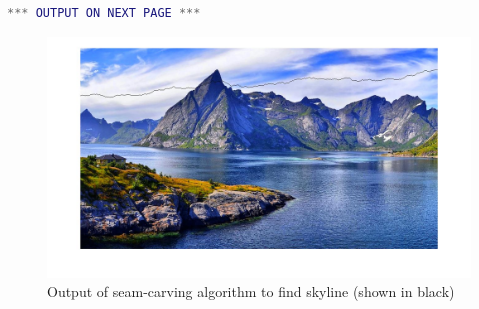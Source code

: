 \documentclass{csc_assignment4}
\begin{document}
\begin{description}
\begin{lstlisting}[language=MATLAB]
*** OUTPUT ON NEXT PAGE ***
\end{lstlisting}
\clearpage
\begin{figure}[h]
\includegraphics[width=1.0\textwidth, center]{seam.jpg}
\vspace*{-15mm}
\caption{Output of seam-carving algorithm to find skyline (shown in black)}
\end{figure}


\end{description}
\end{document}
